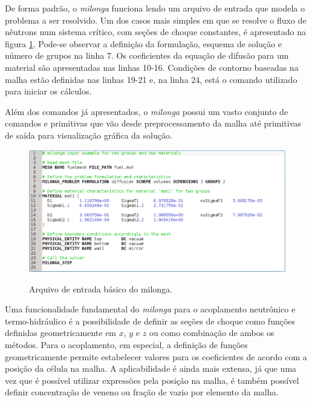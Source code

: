 
De forma padrão, o \textit{milonga} funciona lendo um arquivo de entrada que modela o
problema a ser resolvido. Um dos casos mais simples em que se resolve o fluxo de nêutrons
num sistema crítico, com seções de choque constantes, é apresentado na figura \ref{fig:inputmilonga}.
Pode-se observar a definição da formulação, esquema de solução e número de grupos na linha 7.
Os coeficientes da equação de difusão para um material são apresentadas nas linhas 10-16.
Condições de contorno baseadas na malha estão definidas nas linhas 19-21 e, na linha 24,
está o comando utilizado para iniciar os cálculos.

Além dos comandos já apresentados, o \textit{milonga} possui um vasto conjunto de comandos e primitivas
que vão desde preprocessamento da malha até primitivas de saída para visualização gráfica da
solução.

\begin{figure}[htb]
  \caption{Arquivo de entrada básico do milonga. }
  \centering\includegraphics[scale=0.19]{figuras/milonga_example2.png}
  \label{fig:inputmilonga}
\end{figure}

Uma funcionalidade fundamental do \textit{milonga} para o acoplamento neutrônico
e termo-hidráulico é a possibilidade de definir as seções de choque
como funções definidas geometricamente em $x$, $y$ e $z$
ou como combinação de ambos os métodos. Para o acoplamento, em especial, a definição
de funções geometricamente permite estabelecer valores para os coeficientes de
acordo com a posição da célula na malha. A aplicabilidade é ainda mais extensa, já que
uma vez que é possível utilizar expressões pela posição na malha, é também
possível definir concentração de veneno ou fração de vazio por elemento da malha.

